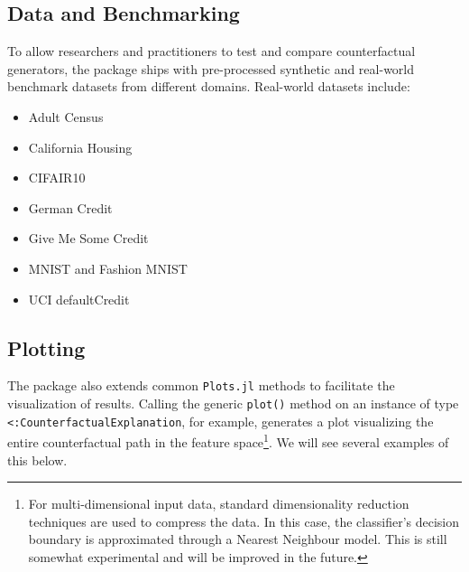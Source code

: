 \documentclass{juliacon}
\begin{document}
\hypertarget{data-and-benchmarking}{%
\subsection{Data and Benchmarking}\label{data-and-benchmarking}}

To allow researchers and practitioners to test and compare
counterfactual generators, the package ships with pre-processed
synthetic and real-world benchmark datasets from different domains.
Real-world datasets include:

\begin{itemize}
\item Adult Census \cite{becker1996adult}
\item California Housing \cite{pace1997sparse}
\item CIFAIR10 \cite{krizhevsky2009learning}
\item German Credit \cite{hoffman1994german}
\item Give Me Some Credit \cite{kaggle2011give}
\item MNIST \cite{lecun1998mnist} and Fashion MNIST \cite{xiao2017fashion}
\item UCI defaultCredit \cite{yeh2009comparisons}
\end{itemize}

\hypertarget{plotting}{%
\subsection{Plotting}\label{plotting}}

The package also extends common \texttt{Plots.jl} methods to facilitate
the visualization of results. Calling the generic \texttt{plot()} method
on an instance of type \texttt{\textless{}:CounterfactualExplanation},
for example, generates a plot visualizing the entire counterfactual path
in the feature space\footnote{For multi-dimensional input data, standard
  dimensionality reduction techniques are used to compress the data. In
  this case, the classifier's decision boundary is approximated through
  a Nearest Neighbour model. This is still somewhat experimental and
  will be improved in the future.}. We will see several examples of this
below.
\end{document}

